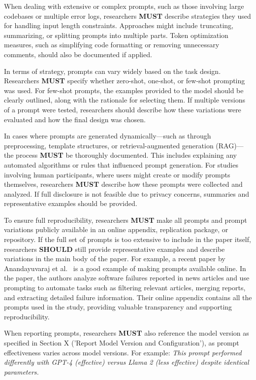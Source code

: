 When dealing with extensive or complex prompts, such as those involving large codebases or multiple error logs, researchers \textbf{MUST} describe strategies they used for handling input length constraints. Approaches might include truncating, summarizing, or splitting prompts into multiple parts. Token optimization measures, such as simplifying code formatting or removing unnecessary comments, should also be documented if applied.

In terms of strategy, prompts can vary widely based on the task design. Researchers \textbf{MUST} specify whether zero-shot, one-shot, or few-shot prompting was used. For few-shot prompts, the examples provided to the model should be clearly outlined, along with the rationale for selecting them. If multiple versions of a prompt were tested, researchers should describe how these variations were evaluated and how the final design was chosen.

In cases where prompts are generated dynamically—such as through preprocessing, template structures, or retrieval-augmented generation (RAG)—the process \textbf{MUST} be thoroughly documented. This includes explaining any automated algorithms or rules that influenced prompt generation. For studies involving human participants, where users might create or modify prompts themselves, researchers \textbf{MUST} describe how these prompts were collected and analyzed. If full disclosure is not feasible due to privacy concerns, summaries and representative examples should be provided.

To ensure full reproducibility, researchers \textbf{MUST} make all prompts and prompt variations publicly available in an online appendix, replication package, or repository. If the full set of prompts is too extensive to include in the paper itself, researchers \textbf{SHOULD} still provide representative examples and describe variations in the main body of the paper. For example, a recent paper by Anandayuvaraj et al.~\cite{anandayuvaraj2024fail} is a good example of making prompts available online. In the paper, the authors analyze software failures reported in news articles and use prompting to automate tasks such as filtering relevant articles, merging reports, and extracting detailed failure information. Their online appendix contains all the prompts used in the study, providing valuable transparency and supporting reproducibility.

When reporting prompts, researchers \textbf{MUST} also reference the model version as specified in Section X ('Report Model Version and Configuration'), as prompt effectiveness varies across model versions. For example: \textit{This prompt performed differently with GPT-4 (effective) versus Llama 2 (less effective) despite identical parameters.}

